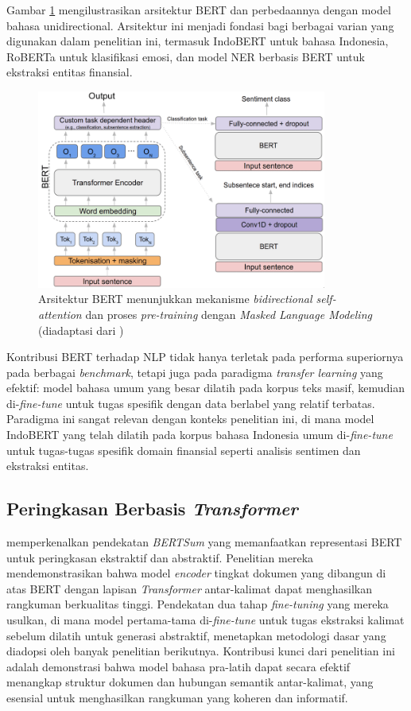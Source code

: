 Gambar \ref{fig:bert-architecture} mengilustrasikan arsitektur BERT dan perbedaannya dengan model bahasa unidirectional. Arsitektur ini menjadi fondasi bagi berbagai varian yang digunakan dalam penelitian ini, termasuk IndoBERT untuk bahasa Indonesia, RoBERTa untuk klasifikasi emosi, dan model NER berbasis BERT untuk ekstraksi entitas finansial.

\begin{figure}[H]
  \centering
  \includegraphics[width=0.85\textwidth]{image/bert-architecture-diagram.png}
  \caption{Arsitektur BERT menunjukkan mekanisme \textit{bidirectional self-attention} dan proses \textit{pre-training} dengan \textit{Masked Language Modeling} (diadaptasi dari \textcite{devlin2019})}
  \label{fig:bert-architecture}
\end{figure}

Kontribusi BERT terhadap NLP tidak hanya terletak pada performa superiornya pada berbagai \textit{benchmark}, tetapi juga pada paradigma \textit{transfer learning} yang efektif: model bahasa umum yang besar dilatih pada korpus teks masif, kemudian di-\textit{fine-tune} untuk tugas spesifik dengan data berlabel yang relatif terbatas. Paradigma ini sangat relevan dengan konteks penelitian ini, di mana model IndoBERT yang telah dilatih pada korpus bahasa Indonesia umum di-\textit{fine-tune} untuk tugas-tugas spesifik domain finansial seperti analisis sentimen dan ekstraksi entitas.

\subsection{Peringkasan Berbasis \textit{Transformer}}

\textcite{liu2019bertsum} memperkenalkan pendekatan \textit{BERTSum} yang memanfaatkan representasi BERT untuk peringkasan ekstraktif dan abstraktif. Penelitian mereka mendemonstrasikan bahwa model \textit{encoder} tingkat dokumen yang dibangun di atas BERT dengan lapisan \textit{Transformer} antar-kalimat dapat menghasilkan rangkuman berkualitas tinggi. Pendekatan dua tahap \textit{fine-tuning} yang mereka usulkan, di mana model pertama-tama di-\textit{fine-tune} untuk tugas ekstraksi kalimat sebelum dilatih untuk generasi abstraktif, menetapkan metodologi dasar yang diadopsi oleh banyak penelitian berikutnya. Kontribusi kunci dari penelitian ini adalah demonstrasi bahwa model bahasa pra-latih dapat secara efektif menangkap struktur dokumen dan hubungan semantik antar-kalimat, yang esensial untuk menghasilkan rangkuman yang koheren dan informatif.

